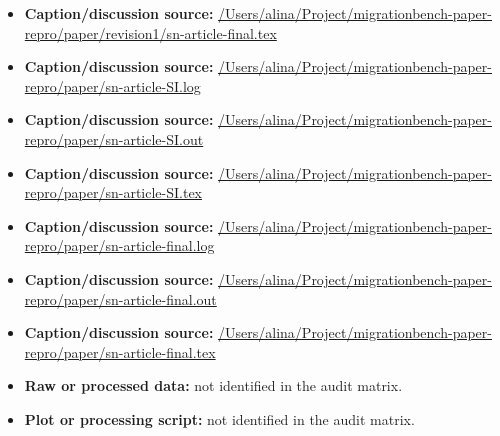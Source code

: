\begin{itemize}[leftmargin=1.4em,noitemsep]
\item \textbf{Caption/discussion source:} \url{/Users/alina/Project/migrationbench-paper-repro/paper/revision1/sn-article-final.tex}
\item \textbf{Caption/discussion source:} \url{/Users/alina/Project/migrationbench-paper-repro/paper/sn-article-SI.log}
\item \textbf{Caption/discussion source:} \url{/Users/alina/Project/migrationbench-paper-repro/paper/sn-article-SI.out}
\item \textbf{Caption/discussion source:} \url{/Users/alina/Project/migrationbench-paper-repro/paper/sn-article-SI.tex}
\item \textbf{Caption/discussion source:} \url{/Users/alina/Project/migrationbench-paper-repro/paper/sn-article-final.log}
\item \textbf{Caption/discussion source:} \url{/Users/alina/Project/migrationbench-paper-repro/paper/sn-article-final.out}
\item \textbf{Caption/discussion source:} \url{/Users/alina/Project/migrationbench-paper-repro/paper/sn-article-final.tex}
\item \textbf{Raw or processed data:} not identified in the audit matrix.
\item \textbf{Plot or processing script:} not identified in the audit matrix.
\end{itemize}
